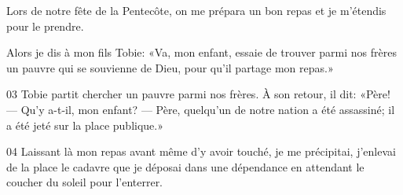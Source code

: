 Lors de notre fête de la Pentecôte, on me prépara un bon repas et je m’étendis pour le prendre.

Alors je dis à mon fils Tobie: «Va, mon enfant, essaie de trouver parmi nos frères un pauvre qui se souvienne de Dieu, pour qu’il partage mon repas.»

03 Tobie partit chercher un pauvre parmi nos frères. À son retour, il dit: «Père! --- Qu’y a-t-il, mon enfant? --- Père, quelqu’un de notre nation a été assassiné; il a été jeté sur la place publique.»

04 Laissant là mon repas avant même d’y avoir touché, je me précipitai, j’enlevai de la place le cadavre que je déposai dans une dépendance en attendant le coucher du soleil pour l’enterrer.
